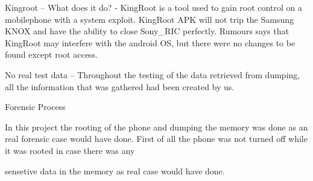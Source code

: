 Kingroot – What does it do? - KingRoot is a tool used to gain root control on a mobilephone with a system exploit. KingRoot APK will not trip the Samsung KNOX and have the ability to close Sony\_RIC perfectly. Rumours says that KingRoot may interfere with the android OS, but there were no changes to be found except root access.

No real test data – Throughout the testing of the data retrieved from dumping, all the information that was gathered had been created by us.

Forensic Process

In this project the rooting of the phone and dumping the memory was done as an real forensic case would have done. First of all the phone was not turned off while it was rooted in case there was any

sensetive data in the memory as real case would have done.